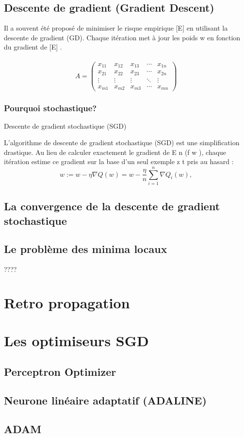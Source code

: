 	\subsection{Descente de gradient (Gradient Descent)}
	
	
	Il a souvent été proposé de minimiser le risque empirique [E] en utilisant la descente de gradient (GD). Chaque itération met à jour les poids w en fonction du gradient de [E] \cite{bottou2012stochastic}.\\
	
	\lipsum[1] \\ 
	
	$$A = \begin{pmatrix}
		x_{11} & x_{12} & x_{13} & \cdots & x_{1n} \\
		x_{21} & x_{22} & x_{23} & \cdots & x_{2n} \\
		\vdots & \vdots & \vdots & \ddots & \vdots \\
		x_{m1} & x_{m2} & x_{m3} & \cdots & x_{mn} 
	\end{pmatrix}$$
	
	
	\lipsum[4]
	\subsubsection{Pourquoi stochastique?}
	Descente de gradient stochastique (SGD) 
	
	L'algorithme de descente de gradient stochastique (SGD) est une simplification drastique. Au lieu de calculer exactement le gradient de E n (f w ), chaque itération estime ce gradient sur la base d'un seul exemple z t pris au hasard \cite{bottou2012stochastic} :
	$$
	{\displaystyle w:=w-\eta \nabla Q(w)=w-{\frac {\eta }{n}}\sum _{i=1}^{n}\nabla Q_{i}(w),}
	$$
	\lipsum[1]	
	\subsection{La convergence de la descente de gradient stochastique}
	\lipsum[1]
	\subsection{Le problème des minima locaux} \cite[page 291][]{antoine2018apprentissage}????
	
	
	\section{Retro propagation}
	
	
	\section{Les optimiseurs SGD}
	\subsection{Perceptron Optimizer}
	
	
	
	\subsection{Neurone linéaire adaptatif (ADALINE)}
	\lipsum[1]
	
	\subsection{ADAM}
